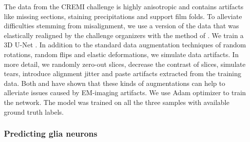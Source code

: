 The data from the CREMI challenge is highly anisotropic and contains artifacts like missing sections, staining precipitations and support film folds. 
To alleviate difficulties stemming from misalignment, we use a version of the data that was elastically realigned by the challenge organizers with the method of \cite{saalfeld2012elastic}.
We train a 3D U-Net \cite{ronneberger2015u, cciccek20163d} . In addition to the standard data augmentation techniques of random rotations, random flips and  elastic deformations, we simulate data artifacts.
In more detail, we randomly zero-out slices, decrease the contrast of slices, simulate tears, introduce alignment jitter and paste artifacts extracted from the training data. Both \cite{funke2018large} and \cite{lee2017superhuman} have shown
that these kinds of augmentations can help to alleviate issues caused by EM-imaging artifacts.
We use Adam optimizer to train the network. The model was trained on all the three samples with available ground truth labels.  

\subsubsection{Predicting glia neurons}
